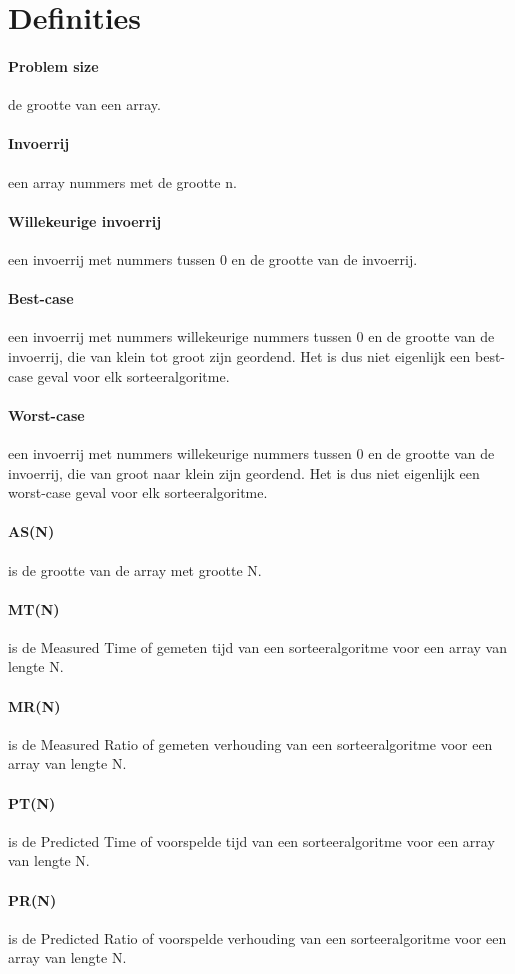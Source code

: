 \section{Definities}

\paragraph{Problem size} de grootte van een array.

\paragraph{Invoerrij} een array nummers met de grootte n.

\paragraph{Willekeurige invoerrij} een invoerrij met nummers tussen 0 en de grootte van de invoerrij.

\paragraph{Best-case} een invoerrij met nummers willekeurige nummers tussen 0 en de grootte van de invoerrij, die van klein tot groot zijn geordend. Het is dus niet eigenlijk een best-case geval voor elk sorteeralgoritme.

\paragraph{Worst-case} een invoerrij met nummers willekeurige nummers tussen 0 en de grootte van de invoerrij, die van groot naar klein zijn geordend. Het is dus niet eigenlijk een worst-case geval voor elk sorteeralgoritme.

\paragraph{AS(N)} is de grootte van de array met grootte N.

\paragraph{MT(N)} is de Measured Time of gemeten tijd van een sorteeralgoritme voor een array van lengte N.

\paragraph{MR(N)} is de Measured Ratio of gemeten verhouding van een sorteeralgoritme voor een array van lengte N.

\paragraph{PT(N)} is de Predicted Time of voorspelde tijd van een sorteeralgoritme voor een array van lengte N.

\paragraph{PR(N)} is de Predicted Ratio of voorspelde verhouding van een sorteeralgoritme voor een array van lengte N.
